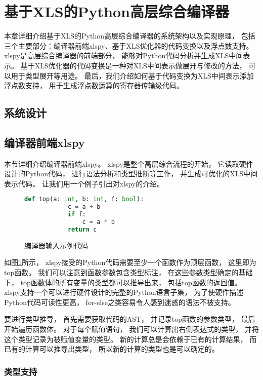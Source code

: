 \section{基于XLS的Python高层综合编译器}

本章详细介绍基于XLS的Python高层综合编译器的系统架构以及实现原理，
包括三个主要部分：编译器前端xlspy、基于XLS优化器的代码变换以及浮点数支持。
xlspy是高层综合编译器的前端部分，
能够对Python代码分析并生成XLS中间表示。
基于XLS优化器的代码变换是一种对XLS中间表示做展开与修改的方法，
可以用于类型展开等用途。
最后，我们介绍如何基于代码变换为XLS中间表示添加浮点数支持，
用于生成浮点数运算的寄存器传输级代码。

\subsection{系统设计}

\subsection{编译器前端xlspy}

本节详细介绍编译器前端xlspy。
xlspy是整个高层综合流程的开始，
它读取硬件设计的Python代码，
进行语法分析和类型推断等工作，
并生成可优化的XLS中间表示代码。
让我们用一个例子引出对xlspy的介绍。

\begin{figure}[h]
    \begin{lstlisting}[language=Python,frame=single]
        def top(a: int, b: int, f: bool):
            c = a + b
            if f:
                c = a * b
            return c
    \end{lstlisting}
    \caption{编译器输入示例代码}
    \label{code.1}
\end{figure}

如图\ref{code.1}所示，
xlspy接受的Python代码需要至少一个函数作为顶层函数，
这里即为top函数。
我们可以注意到函数参数包含类型标注，
在这些参数类型确定的基础下，
top函数体的所有变量的类型都可以推导出来，
包括top函数的返回值。
xlspy支持一个可以进行硬件设计的完整的Python语言子集，
为了使硬件描述Python代码可读性更高，
for-else之类容易令人感到迷惑的语法不被支持。

要进行类型推导，
首先需要获取代码的AST，
并记录top函数的参数类型，
最后开始遍历函数体。
对于每个赋值语句，
我们可以计算出右侧表达式的类型，
并将这个类型记录为被赋值变量的类型。
新的计算总是会依赖于已有的计算结果，
而已有的计算可以推导出类型，
所以新的计算的类型也是可以确定的。

\subsubsection{类型支持}

